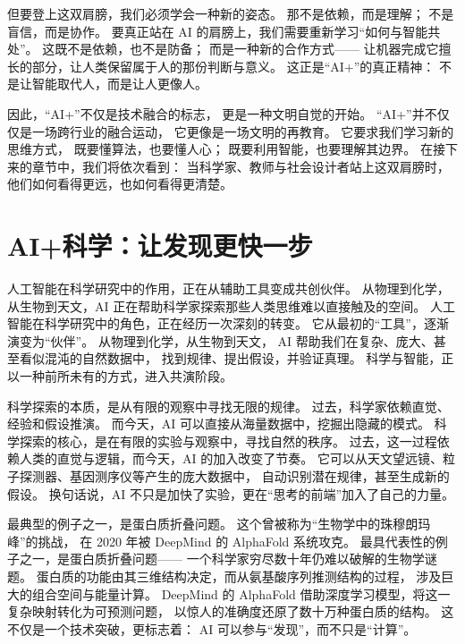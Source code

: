 但要登上这双肩膀，我们必须学会一种新的姿态。  
那不是依赖，而是理解；  
不是盲信，而是协作。  
要真正站在 AI 的肩膀上，我们需要重新学习“如何与智能共处”。  
这既不是依赖，也不是防备；  
而是一种新的合作方式——  
让机器完成它擅长的部分，让人类保留属于人的那份判断与意义。  
这正是“AI+”的真正精神：  
不是让智能取代人，而是让人更像人。

因此，“AI+”不仅是技术融合的标志，  
更是一种文明自觉的开始。  
“AI+”并不仅仅是一场跨行业的融合运动，  
它更像是一场文明的再教育。  
它要求我们学习新的思维方式，  
既要懂算法，也要懂人心；  
既要利用智能，也要理解其边界。  
在接下来的章节中，我们将依次看到：  
当科学家、教师与社会设计者站上这双肩膀时，  
他们如何看得更远，也如何看得更清楚。


\section{AI+科学：让发现更快一步}

人工智能在科学研究中的作用，正在从辅助工具变成共创伙伴。  
从物理到化学，从生物到天文，AI 正在帮助科学家探索那些人类思维难以直接触及的空间。  
人工智能在科学研究中的角色，正在经历一次深刻的转变。  
它从最初的“工具”，逐渐演变为“伙伴”。  
从物理到化学，从生物到天文，  
AI 帮助我们在复杂、庞大、甚至看似混沌的自然数据中，  
找到规律、提出假设，并验证真理。  
科学与智能，正以一种前所未有的方式，进入共演阶段。

科学探索的本质，是从有限的观察中寻找无限的规律。  
过去，科学家依赖直觉、经验和假设推演。  
而今天，AI 可以直接从海量数据中，挖掘出隐藏的模式。  
科学探索的核心，是在有限的实验与观察中，寻找自然的秩序。  
过去，这一过程依赖人类的直觉与逻辑，而今天，AI 的加入改变了节奏。  
它可以从天文望远镜、粒子探测器、基因测序仪等产生的庞大数据中，  
自动识别潜在规律，甚至生成新的假设。  
换句话说，AI 不只是加快了实验，更在“思考的前端”加入了自己的力量。

最典型的例子之一，是蛋白质折叠问题。  
这个曾被称为“生物学中的珠穆朗玛峰”的挑战，  
在 2020 年被 DeepMind 的 AlphaFold 系统攻克。  
最具代表性的例子之一，是蛋白质折叠问题——  
一个科学家穷尽数十年仍难以破解的生物学谜题。  
蛋白质的功能由其三维结构决定，而从氨基酸序列推测结构的过程，  
涉及巨大的组合空间与能量计算。  
DeepMind 的 AlphaFold 借助深度学习模型，将这一复杂映射转化为可预测问题，  
以惊人的准确度还原了数十万种蛋白质的结构。  
这不仅是一个技术突破，更标志着：  
AI 可以参与“发现”，而不只是“计算”。

